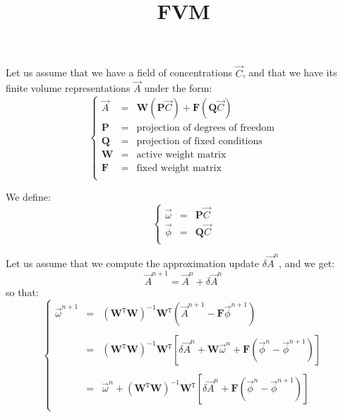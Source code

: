 \documentclass[aps,onecolumn,11pt]{revtex4}
\newcommand{\mat}[1]{{\bm{#1}}}
\newcommand{\trn}[1]{{{{#1}}^{\mathtt{T}}}}
\begin{document}
\title{FVM}
\maketitle

Let us assume that we have a field of concentrations $\vec{C}$,
and that we have its finite volume representations $\vec{A}$ under the form:
\begin{equation}
\left\lbrace
\begin{array}{rcl}
	\vec{A} & = & \mat{W} \left(\mat{P}\vec{C}\right) + \mat{F} \left(\mat{Q}\vec{C}\right)\\
	\mat{P} & = & \text{projection of degrees of freedom}\\
	\mat{Q} & = & \text{projection of fixed conditions}\\
	\mat{W} & = & \text{active weight matrix}\\
	\mat{F} & = & \text{fixed weight matrix}\\
\end{array}
\right.
\end{equation}

We define:
\begin{equation}
\left\lbrace
\begin{array}{rcl}
	\vec{\omega} & = & \mat{P}\vec{C}\\
	\vec{\phi}   & = & \mat{Q}\vec{C}\\
\end{array}
\right.
\end{equation}

Let us assume that we compute the approximation update $\delta\vec{A}^n$, and we get:
\begin{equation}
	\vec{A}^{n+1} = \vec{A}^n + \delta\vec{A}^n
\end{equation}
so that:
\begin{equation}
\left\lbrace
\begin{array}{rcl}
	\vec{\omega}^{n+1} & = & \left(\trn{\mat{W}}\mat{W}\right)^{-1} \trn{\mat{W}} \left( \vec{A}^{n+1} -   \mat{F} \vec{\phi}^{n+1}\right)\\
	\\
	& = &  \left(\trn{\mat{W}}\mat{W}\right)^{-1} \trn{\mat{W}} 
	\left[ \delta\vec{A}^{n} + \mat{W} \vec{\omega}^n + \mat{F} \left(\vec{\phi}^{n} - \vec{\phi}^{n+1}\right) \right]\\
	\\
	& = & \vec{\omega}^n + 
	\left(\trn{\mat{W}}\mat{W}\right)^{-1} \trn{\mat{W}} \left[ \delta\vec{A}^{n} + \mat{F} \left(\vec{\phi}^{n} - \vec{\phi}^{n+1}\right) \right]\\
\end{array}
\right.
\end{equation}
\end{document}
